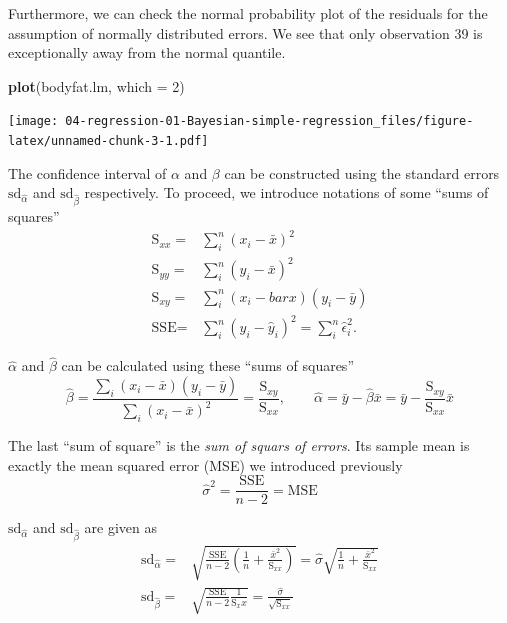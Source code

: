 \documentclass[]{book}
\newenvironment{Shaded}{\begin{snugshade}}{\end{snugshade}}
\newcommand{\KeywordTok}[1]{\textcolor[rgb]{0.13,0.29,0.53}{\textbf{#1}}}
\newcommand{\DataTypeTok}[1]{\textcolor[rgb]{0.13,0.29,0.53}{#1}}
\newcommand{\DecValTok}[1]{\textcolor[rgb]{0.00,0.00,0.81}{#1}}
\newcommand{\NormalTok}[1]{#1}
\theoremstyle{definition}
\theoremstyle{definition}
\theoremstyle{definition}
\theoremstyle{remark}
\begin{document}
Furthermore, we can check the normal probability plot of the residuals
for the assumption of normally distributed errors. We see that only
observation 39 is exceptionally away from the normal quantile.

\begin{Shaded}
\begin{Highlighting}[]
\KeywordTok{plot}\NormalTok{(bodyfat.lm, }\DataTypeTok{which =} \DecValTok{2}\NormalTok{)}
\end{Highlighting}
\end{Shaded}

\texttt{[image: 04-regression-01-Bayesian-simple-regression\_files/figure-latex/unnamed-chunk-3-1.pdf]}

The confidence interval of \(\alpha\) and \(\beta\) can be constructed
using the standard errors \(\text{sd}_{\hat{\alpha}}\) and
\(\text{sd}_{\hat{\beta}}\) respectively. To proceed, we introduce
notations of some ``sums of squares'' \[
\begin{aligned}
\text{S}_{xx} = & \sum_i^n (x_i-\bar{x})^2\\
\text{S}_{yy} = & \sum_i^n (y_i-\bar{x})^2 \\
\text{S}_{xy} = & \sum_i^n (x_i-bar{x})(y_i-\bar{y}) \\
\text{SSE}    = & \sum_i^n (y_i-\hat{y}_i)^2 = \sum_i^n \hat{\epsilon}_i^2. 
\end{aligned}
\]

\(\hat{\alpha}\) and \(\hat{\beta}\) can be calculated using these
``sums of squares''
\[ \hat{\beta} = \frac{\sum_i (x_i-\bar{x})(y_i-\bar{y})}{\sum_i (x_i-\bar{x})^2} = \frac{\text{S}_{xy}}{\text{S}_{xx}},\qquad \hat{\alpha} = \bar{y} - \hat{\beta}\bar{x} = \bar{y}-\frac{\text{S}_{xy}}{\text{S}_{xx}}\bar{x} \]

The last ``sum of square'' is the \emph{sum of squars of errors}. Its
sample mean is exactly the mean squared error (MSE) we introduced
previously \[
\hat{\sigma}^2 = \frac{\text{SSE}}{n-2} = \text{MSE}
\]

\(\text{sd}_{\hat{\alpha}}\) and \(\text{sd}_{\hat{\beta}}\) are given
as \[ 
\begin{aligned}
\text{sd}_{\hat{\alpha}} = &  \sqrt{\frac{\text{SSE}}{n-2}\left(\frac{1}{n}+\frac{\bar{x}^2}{\text{S}_{xx}}\right)} = \hat{\sigma}\sqrt{\frac{1}{n}+\frac{\bar{x}^2}{\text{S}_{xx}}}\\
\text{sd}_{\hat{\beta}} = & \sqrt{\frac{\text{SSE}}{n-2}\frac{1}{\text{S}_xx}} = \frac{\hat{\sigma}}{\sqrt{\text{S}_{xx}}}
\end{aligned}
\]
\end{document}
